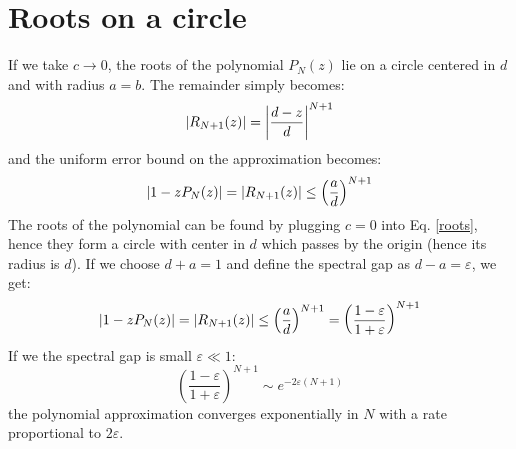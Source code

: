 \section{Roots on a circle}
If we take $c \to 0$, the roots of the polynomial $P_N(z)$ lie on a circle centered in $d$ and with radius $a = b$. The remainder simply becomes:
\begin{equation}
    \abs{R_{N+1}(z)} = \abs{\frac{d - z}{d}}^{N+1}
\end{equation}
and the uniform error bound on the approximation becomes:
\begin{equation}
    \abs{1 - zP_N(z)} = \abs{R_{N+1}(z)} \leq \left(\frac{a}{d} \right)^{N+1}
\end{equation}
The roots of the polynomial can be found by plugging $c = 0$ into Eq. \eqref{roots}, hence they form a circle with center in $d$ which passes by the origin (hence its radius is $d$). If we choose $d + a = 1$ and define the spectral gap as $d - a = \varepsilon$, we get:
\begin{equation}
    \abs{1 - zP_N(z)} = \abs{R_{N+1}(z)} \leq \left(\frac{a}{d} \right)^{N+1} = \left(\frac{1 - \varepsilon}{1 + \varepsilon}\right)^{N+1}
\end{equation}
If we the spectral gap is small $\varepsilon \ll 1$:
\begin{equation}
    \left(\frac{1 - \varepsilon}{1 + \varepsilon}\right)^{N+1} \sim e^{-2\varepsilon(N+1)}
\end{equation}
the polynomial approximation converges exponentially in $N$ with a rate proportional to $2\varepsilon$.